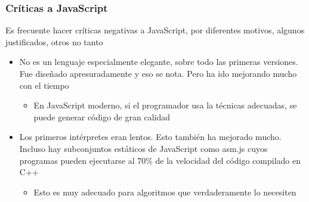 \documentclass[ucs]{beamer}
\begin{document}
\begin{frame}[fragile]
\frametitle{Críticas a JavaScript}

Es frecuente hacer críticas negativas a JavaScript, por diferentes motivos,
algunos justificados, otros no tanto

\begin{itemize}
\item
No es un lenguaje especialmente elegante, sobre todo las
primeras versiones. Fue diseñado apresuradamente y eso se nota. 
Pero ha ido mejorando mucho con el tiempo

    \begin{itemize}
    \item
 En
JavaScript moderno, si el programador usa la técnicas adecuadas,
se puede generar código de gran calidad
    \end{itemize}

\item
Los primeros intérpretes eran lentos. Esto también ha mejorado mucho.
Incluso hay subconjuntos estáticos de JavaScript como asm.js cuyos
programas pueden ejecutarse al 70\% de la velocidad del código
compilado en C++
\begin{itemize}
\item
Esto es muy adecuado para algoritmos que verdaderamente lo necesiten
\end{itemize}
\end{itemize}
\end{frame}
\end{document}
